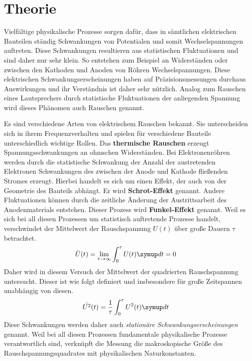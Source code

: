 \section{Theorie}
\label{sec:theorie}

Vielfältige physikalische Prozesse sorgen dafür, dass in sämtlichen elektrischen Bauteilen ständig Schwankungen von Potentialen und somit Wechselspannungen auftreten. Diese Schwankungen resultieren aus statistischen Fluktuationen und sind daher nur sehr klein. So entstehen zum Beispiel an Widerständen oder zwischen den Kathoden und Anoden von Röhren Wechselspannungen. Diese elektrischen Schwankungserscheinungen haben auf Präzisionsmessungen durchaus Auswirkungen und ihr Verständnis ist daher sehr nützlich. Analog zum Rauschen eines Lautsprechers durch statistische Fluktuationen der anliegenden Spannung wird dieses Phänomen auch Rauschen genannt.

Es sind verschiedene Arten von elektrischem Rauschen bekannt. Sie unterscheiden sich in ihrem Frequenzverhalten und spielen für verschiedene Bauteile unterschiedlich wichtige Rollen. Das \textbf{thermische Rauschen} erzeugt Spannungsschwankungen an ohmschen Widerständen. Bei Elektronenröhren werden durch die statistische Schwankung der Anzahl der austretenden Elektronen Schwankungen des zwischen der Anode und Kathode fließenden Stromes erzeugt. Hierbei handelt es sich um einen Effekt, der auch von der Geometrie des Bauteils abhängt. Er wird \textbf{Schrot-Effekt} genannt. Andere Fluktuationen können durch die zeitliche Änderung der Austrittsarbeit des Anodenmaterials entstehen. Dieser Prozess wird \textbf{Funkel-Effekt} genannt. Weil es sich bei all diesen Prozessen um statistisch auftretende Prozesse handelt, verschwindet der Mittelwert der Rauschspannung $U(t)$ über große Dauern $\tau$ betrachtet.
%
\begin{equation}
  \bar{U}(t)=\lim_{\tau\rightarrow\infty}\int_0^\tau U(t)\upd t=0
\end{equation}
%
Daher wird in diesem Versuch der Mittelwert der quadrierten Rauschspannung untersucht. Dieser ist wie folgt definiert und insbesondere für große Zeitspannen unabhängig von diesen.
%
\begin{equation}
  \bar{U^2}(t) =\frac{1}{\tau}\int_0^\tau U^2(t) \upd t
\end{equation}
%
Diese Schwankungen werden daher auch \textit{stationäre Schwankungserscheinungen} genannt. Weil bei all diesen Prozessen fundamentale physikalische Prozesse verantwortlich sind, verknüpft die Messung die makroskopische Größe des Rauschspannungsquadrates mit physikalischen Naturkonstanten.

